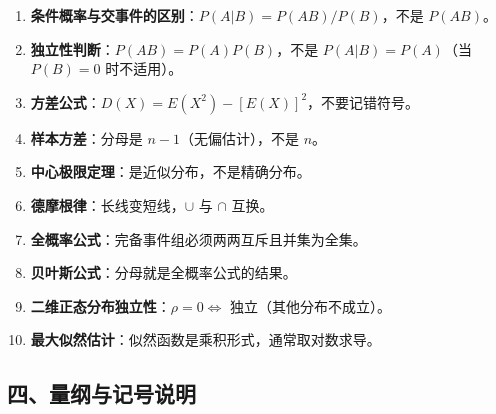 \documentclass[12pt,a4paper]{ctexart}
\begin{document}
\begin{enumerate}[noitemsep]
    \item \textbf{条件概率与交事件的区别}：$P(A|B) = P(AB)/P(B)$，不是 $P(AB)$。
    \item \textbf{独立性判断}：$P(AB) = P(A)P(B)$，不是 $P(A|B) = P(A)$（当 $P(B)=0$ 时不适用）。
    \item \textbf{方差公式}：$D(X) = E(X^2) - [E(X)]^2$，不要记错符号。
    \item \textbf{样本方差}：分母是 $n-1$（无偏估计），不是 $n$。
    \item \textbf{中心极限定理}：是近似分布，不是精确分布。
    \item \textbf{德摩根律}：长线变短线，$\cup$ 与 $\cap$ 互换。
    \item \textbf{全概率公式}：完备事件组必须两两互斥且并集为全集。
    \item \textbf{贝叶斯公式}：分母就是全概率公式的结果。
    \item \textbf{二维正态分布独立性}：$\rho = 0 \iff$ 独立（其他分布不成立）。
    \item \textbf{最大似然估计}：似然函数是乘积形式，通常取对数求导。
\end{enumerate}

\subsection*{四、量纲与记号说明}
\end{document}
